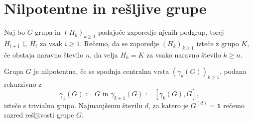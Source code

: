 \documentclass[mat1, tisk]{fmfdelo}
\numberwithin{equation}{section}  %
\begin{document}

\section{Nilpotentne in rešljive grupe}




\begin{definicija}
\label{def_iztek_zaporedja}
Naj bo $G$ grupa in $(H_k)_{k \ge 1}$ padajoče zaporedje njenih podgrup, torej $H_{i + 1} \subseteq H_{i}$ za vsak $i \ge 1$. 
Rečemo, da se zaporedje $(H_k)_{k \ge 1}$ izteče z grupo $K$, če obstaja naravno število $n$, da velja $H_k = K$ za vsako naravno število $k \ge n$.
\end{definicija}


\begin{definicija}
\label{def_nilpotentna_grupa}
Grupa $G$ je nilpotentna, če se spodnja centralna vrsta $(\gamma_k(G))_{k \ge 1}$, podana rekurzivno z \begin{equation*}
\gamma_1(G) := G \text{ in } \gamma_{k +1}(G) := [\gamma_k(G), G],
\end{equation*}  
izteče s trivialno grupo. Najmanjšemu številu $d$, za katero je $G^{(d)} = \mathbf{1}$ rečemo razred rešljivosti grupe $G$.    
\end{definicija}
\end{document}
